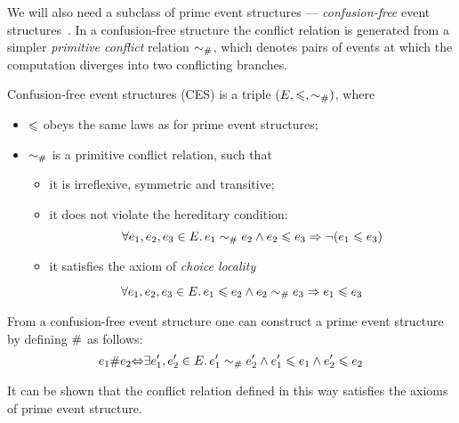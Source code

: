 We will also need a subclass of prime event structures --- 
\emph{confusion-free} event structures~\cite{Nielsen-al:1981}. 
In a confusion-free structure the conflict relation is generated from 
a simpler \emph{primitive conflict} relation $\sim_{\#}$,
which denotes pairs of events at which the computation
diverges into two conflicting branches. 

\begin{definition}
Confusion-free event structures (CES) is a triple $(E, \leqslant, \sim_{\#})$, where
\begin{itemize}
  \item $\leqslant$ obeys the same laws as for prime event structures;
  \item $\sim_{\#}$ is a primitive conflict relation, such that
  \begin{itemize}
    \item it is irreflexive, symmetric and transitive;
    \item it does not violate the hereditary condition:
    $$ \forall e_1, e_2, e_3 \in E \ldotp 
       e_1 \sim_{\#} e_2 \land e_2 \leqslant e_3 \Rightarrow \neg (e_1 \leqslant e_3) $$
    \item it satisfies the axiom of \emph{choice locality}
  \end{itemize}
    $$ \forall e_1, e_2, e_3 \in E \ldotp e_1 \leqslant e_2 \land e_2 \sim_{\#} e_3 \Rightarrow e_1 \leqslant e_3 $$
\end{itemize}
\end{definition}

From a confusion-free event structure one can construct a prime event structure
by defining $\#$ as follows:
$$ e_1 \# e_2 {\Leftrightarrow} 
   \exists e'_1, e'_2 \in E \ldotp e'_1 \sim_{\#} e'_2 \land
   e'_1 \leqslant e_1 \land e'_2 \leqslant e_2 $$

It can be shown that the conflict relation defined in this way 
satisfies the axioms of prime event structure.





